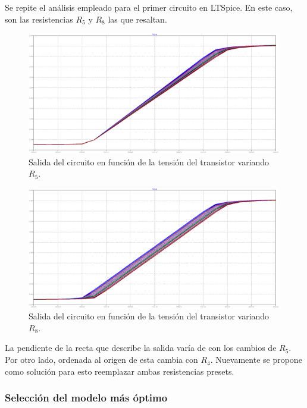 \documentclass[a4paper]{article}
\begin{document}
Se repite el análisis empleado para el primer circuito en LTSpice. En este caso, son las resistencias $R_5$ y $R_8$ las que resaltan.

\begin{figure}[H]
	\centering
	\includegraphics[width=0.99\textwidth]{Ejercicio6/Imagenes/StepR5-M2.png}
	\caption{Salida del circuito en función de la tensión del transistor variando $R_5$.}
	\label{fig:r5-M2}
\end{figure}

\begin{figure}[H]
	\centering
	\includegraphics[width=0.99\textwidth]{Ejercicio6/Imagenes/StepR8-M2.png}
	\caption{Salida del circuito en función de la tensión del transistor variando $R_8$.}
	\label{fig:r8-M2}
\end{figure}

La pendiente de la recta que describe la salida varía de con los cambios de $R_5$. Por otro lado, ordenada al origen de esta cambia con $R_4$. Nuevamente se propone como solución para esto reemplazar ambas resistencias presets.

\subsubsection{Selección del modelo más óptimo}
\end{document}
